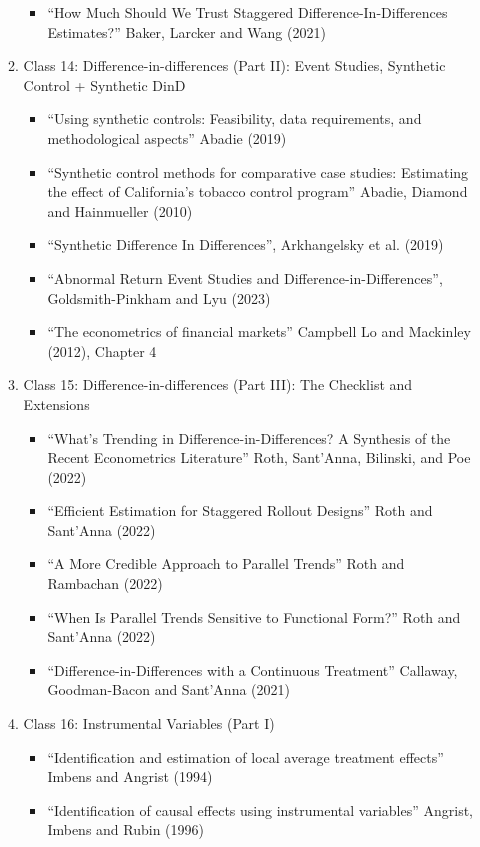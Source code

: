 \documentclass[11pt, a4paper]{article}
\begin{document}
\begin{enumerate}
\begin{enumerate}
\begin{itemize}
    \item ``How Much Should We Trust Staggered Difference-In-Differences Estimates?'' Baker, Larcker and Wang (2021)
    \end{itemize}
  \item Class 14: Difference-in-differences (Part II): Event Studies, Synthetic Control + Synthetic DinD
    \begin{itemize}
    \item ``Using synthetic controls: Feasibility, data requirements, and methodological aspects'' Abadie (2019)
    \item ``Synthetic control methods for comparative case studies: Estimating the effect of California’s tobacco control program'' Abadie, Diamond and Hainmueller (2010)
    \item ``Synthetic Difference In Differences'', Arkhangelsky et al. (2019)
    \item ``Abnormal Return Event Studies and Difference-in-Differences'', Goldsmith-Pinkham and Lyu (2023)
    \item ``The econometrics of financial markets'' Campbell Lo and Mackinley (2012), Chapter 4
    \end{itemize}
  \item Class 15: Difference-in-differences (Part III): The Checklist and Extensions
    \begin{itemize}
    \item ``What’s Trending in Difference-in-Differences? A Synthesis of the Recent Econometrics Literature'' Roth, Sant’Anna,  Bilinski, and Poe (2022)
    \item ``Efficient Estimation for Staggered Rollout Designs'' Roth and Sant'Anna (2022)
    \item ``A More Credible Approach to Parallel Trends'' Roth and Rambachan (2022)
    \item ``When Is Parallel Trends Sensitive to Functional Form?'' Roth and Sant'Anna (2022)
    \item ``Difference-in-Differences with a Continuous Treatment'' Callaway, Goodman-Bacon and Sant'Anna (2021)
    \end{itemize}
  \item Class 16: Instrumental Variables (Part I)
    \begin{itemize}
    \item ``Identification and estimation of local average treatment effects'' Imbens and Angrist (1994)
    \item ``Identification of causal effects using instrumental variables'' Angrist, Imbens and Rubin (1996)

\end{itemize}
\end{enumerate}
\end{enumerate}
\end{document}
